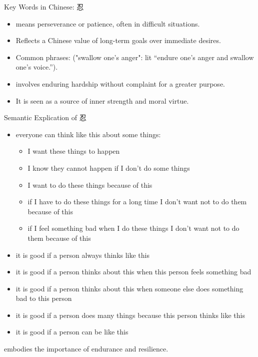 \documentclass{beamer}
\begin{document}
\begin{frame}{Key Words in Chinese: 忍 }
    \begin{itemize}
        \item {} means perseverance or patience, often in difficult situations.
        \item Reflects a Chinese value of long-term goals over immediate desires.
        \item Common phrases:  ("swallow one's anger": lit “endure one's anger and swallow one's voice.”).
        \item {} involves enduring hardship without complaint for a greater purpose.
        \item It is seen as a source of inner strength and moral virtue.
    \end{itemize}
\end{frame}

\begin{frame}{Semantic Explication of  忍 }
    \begin{itemize}
    \item everyone can think like this about some things:
      \begin{itemize}
      \item I want these things to happen
      \item I know they cannot happen if I don't do some things
      \item I want to do these things because of this
      \item if I have to do these things for a long time I don't want not to do them
        because of this
      \item if I feel something bad when I do these things I don't want not to do
        them because of this
      \end{itemize}
    \item it is good if a person always thinks like this
    \item it is good if a person thinks about this when this person feels something bad
\item it is good if a person thinks about this when someone else does something bad to this person
\item it is good if a person does many things because this person thinks like this
\item it is good if a person can be like this     
        \end{itemize}
\bigskip
         embodies the importance of endurance and resilience.
        
\end{frame}
\end{document}
